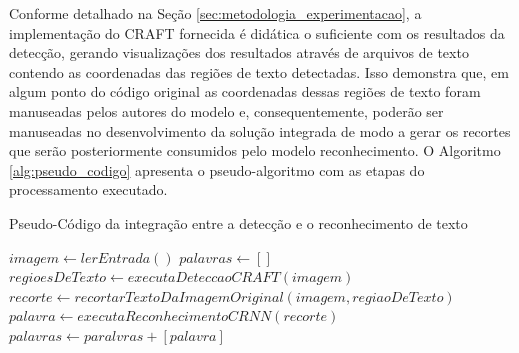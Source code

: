 Conforme detalhado na Seção \ref{sec:metodologia_experimentacao}, a implementação do CRAFT fornecida é didática o suficiente com os resultados da detecção, 
gerando visualizações dos resultados através de arquivos de texto contendo as coordenadas das regiões de texto detectadas. Isso demonstra que, em algum ponto 
do código original as coordenadas dessas regiões de texto foram manuseadas pelos autores do modelo e, consequentemente, poderão ser manuseadas no 
desenvolvimento da solução integrada de modo a gerar os recortes que serão posteriormente consumidos pelo modelo reconhecimento. O Algoritmo \ref{alg:pseudo_codigo} 
apresenta o pseudo-algoritmo com as etapas do processamento executado.


\begin{algorithm}
\caption{Pseudo-Código da integração entre a detecção e o reconhecimento de texto}\label{alg:pseudo_codigo}
\begin{algorithmic}
\State $imagem \gets{lerEntrada()}$
\State $palavras \gets{[ ]}$
\State $regioesDeTexto \gets{executaDeteccaoCRAFT(imagem)}$
    \State $recorte \gets{recortarTextoDaImagemOriginal(imagem,regiaoDeTexto)}$
    \State $palavra \gets{executaReconhecimentoCRNN(recorte)}$
    \State $palavras \gets{paralvras + [palavra]}$
\EndFor
\State{}
\end{algorithmic}
\end{algorithm}




